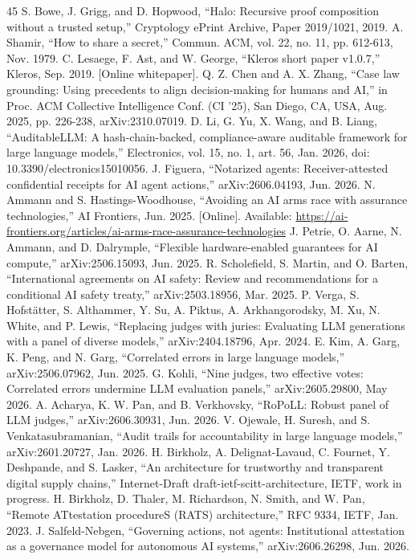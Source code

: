 \documentclass[conference]{IEEEtran}
\begin{document}
\begin{thebibliography}{45}
 S. Bowe, J. Grigg, and D. Hopwood, ``Halo: Recursive proof composition without a trusted setup,'' Cryptology ePrint Archive, Paper 2019/1021, 2019.
 A. Shamir, ``How to share a secret,'' Commun. ACM, vol. 22, no. 11, pp. 612-613, Nov. 1979.
 C. Lesaege, F. Ast, and W. George, ``Kleros short paper v1.0.7,'' Kleros, Sep. 2019. [Online whitepaper].
 Q. Z. Chen and A. X. Zhang, ``Case law grounding: Using precedents to align decision-making for humans and AI,'' in Proc. ACM Collective Intelligence Conf. (CI '25), San Diego, CA, USA, Aug. 2025, pp. 226-238, arXiv:2310.07019.
 D. Li, G. Yu, X. Wang, and B. Liang, ``AuditableLLM: A hash-chain-backed, compliance-aware auditable framework for large language models,'' Electronics, vol. 15, no. 1, art. 56, Jan. 2026, doi: 10.3390/electronics15010056.
 J. Figuera, ``Notarized agents: Receiver-attested confidential receipts for AI agent actions,'' arXiv:2606.04193, Jun. 2026.
 N. Ammann and S. Hastings-Woodhouse, ``Avoiding an AI arms race with assurance technologies,'' AI Frontiers, Jun. 2025. [Online]. Available: \url{https://ai-frontiers.org/articles/ai-arms-race-assurance-technologies}
 J. Petrie, O. Aarne, N. Ammann, and D. Dalrymple, ``Flexible hardware-enabled guarantees for AI compute,'' arXiv:2506.15093, Jun. 2025.
 R. Scholefield, S. Martin, and O. Barten, ``International agreements on AI safety: Review and recommendations for a conditional AI safety treaty,'' arXiv:2503.18956, Mar. 2025.
 P. Verga, S. Hofstätter, S. Althammer, Y. Su, A. Piktus, A. Arkhangorodsky, M. Xu, N. White, and P. Lewis, ``Replacing judges with juries: Evaluating LLM generations with a panel of diverse models,'' arXiv:2404.18796, Apr. 2024.
 E. Kim, A. Garg, K. Peng, and N. Garg, ``Correlated errors in large language models,'' arXiv:2506.07962, Jun. 2025.
 G. Kohli, ``Nine judges, two effective votes: Correlated errors undermine LLM evaluation panels,'' arXiv:2605.29800, May 2026.
 A. Acharya, K. W. Pan, and B. Verkhovsky, ``RoPoLL: Robust panel of LLM judges,'' arXiv:2606.30931, Jun. 2026.
 V. Ojewale, H. Suresh, and S. Venkatasubramanian, ``Audit trails for accountability in large language models,'' arXiv:2601.20727, Jan. 2026.
 H. Birkholz, A. Delignat-Lavaud, C. Fournet, Y. Deshpande, and S. Lasker, ``An architecture for trustworthy and transparent digital supply chains,'' Internet-Draft draft-ietf-scitt-architecture, IETF, work in progress.
 H. Birkholz, D. Thaler, M. Richardson, N. Smith, and W. Pan, ``Remote ATtestation procedureS (RATS) architecture,'' RFC 9334, IETF, Jan. 2023.
 J. Salfeld-Nebgen, ``Governing actions, not agents: Institutional attestation as a governance model for autonomous AI systems,'' arXiv:2606.26298, Jun. 2026.
\end{thebibliography}
\end{document}

